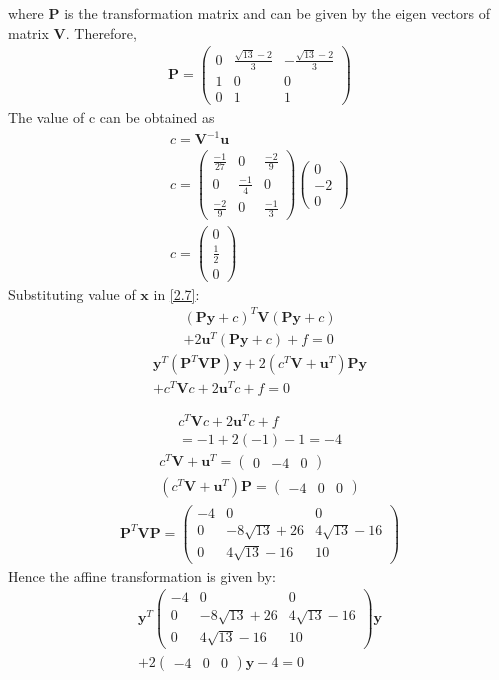 \documentclass[journal,12pt,twocolumn]{IEEEtran}
\let\vec\mathbf
\numberwithin{equation}{subsection}
\newcommand{\myvec}[1]{\ensuremath{\begin{pmatrix}#1\end{pmatrix}}}
\providecommand{\brak}[1]{\ensuremath{\left(#1\right)}}
\begin{document}
\begin{enumerate}
\begin{enumerate}
where $\vec{P}$ is the transformation matrix and can be given by the eigen vectors of matrix $\vec{V}$. Therefore,
\begin{align}
\vec{P} = \myvec{0 &\frac{\sqrt{13} -2}{3}&-\frac{\sqrt{13} -2}{3}\\1 &0&0\\0&1&1}
\end{align}
The value of c can be obtained as
\begin{align}
c = \vec{V}^{-1}\vec{u }\\
c = \myvec{\frac{-1}{27} & 0 &\frac{-2}{9}\\ 0 & \frac{-1}{4} & 0 \\ \frac{-2}{9} & 0 &\frac{-1}{3}}\myvec{0\\-2\\0}\\
c= \myvec{0\\\frac{1}{2}\\0}
\end{align}
Substituting value of $\vec{x}$ in  \eqref{2.7}: 
\begin{multline}
    \brak{\vec{P}\vec{y}+c}^T\vec{V}\brak{\vec{P}\vec{y}+c}\\+2\vec{u}^T\brak{\vec{P}\vec{y}+c}+f=0
\end{multline}
\begin{multline}
        \vec{y}^T\brak{\vec{P}^T\vec{V}\vec{P}}\vec{y}+2\brak{c^T\vec{V}+ \vec{u}^T}\vec{P}\vec{y}\\+c^T\vec{V}c+2\vec{u}^Tc+f=0
\end{multline}

\begin{multline}
    c^T\vec{V}c+2\vec{u}^Tc+f\\
      = -1 +2(-1) -1 = -4
\end{multline}
\begin{align}
    c^T\vec{V}+\vec{u}^T= \myvec{0& -4&0}\\
\brak{c^T\vec{V}+\vec{u}^T}\vec{P} =  \myvec{-4&0&0}
\end{align}
\begin{multline}
 \vec{P}^T\vec{V}\vec{P} = \myvec{-4 &0&0\\0& -8\sqrt{13} + 26 & 4\sqrt{13}-16\\ 0 & 4\sqrt{13}-16&10}
\end{multline}
Hence the affine transformation is given by:
\begin{multline}
\vec{y}^T \myvec{-4 &0&0\\0& -8\sqrt{13} + 26 & 4\sqrt{13}-16\\ 0 & 4\sqrt{13}-16&10}\vec{y}\\ + 2\myvec{-4& 0&0}\vec{y}-4 =0
\end{multline}
\end{enumerate}


\end{enumerate}
\end{document}
